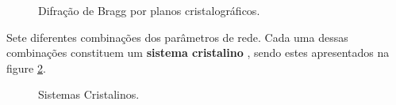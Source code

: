 \begin{figure}[ht]
    \center
    \begin{minipage}{13cm}
     \caption{Difração de Bragg por planos cristalográficos.}\label{figureCristallographicPlanes} 
     \end{minipage}
\end{figure}

Sete diferentes combinações dos parâmetros de rede. Cada uma dessas combinações
constituem um \textbf{sistema cristalino} \cite{pptDifracaoRaioXAntonioCarlos},
sendo estes apresentados na figure \ref{figureCrystalSystems}.

\begin{figure}[ht]
    \center
    \begin{minipage}{15cm}
     \caption{Sistemas Cristalinos.}\label{figureCrystalSystems} 
     \end{minipage}
\end{figure}


